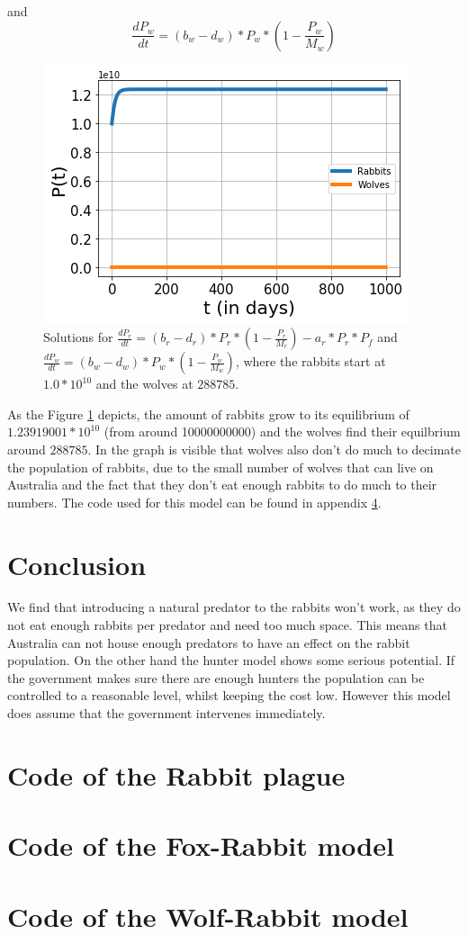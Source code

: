 \documentclass{article}
\begin{document}
and 
$$\frac{dP_w}{dt}=(b_w-d_w)*P_w*(1-\frac{P_w}{M_w})$$
\begin{figure}[h!]
    \centering
    \includegraphics[scale=0.78]{Pictures/RabbitWolves.png}
    \caption{Solutions for $\frac{dP_r}{dt}=(b_r-d_r)*P_r*(1-\frac{P_r}{M_r})-a_r*P_r*P_f$ and $\frac{dP_w}{dt}=(b_w-d_w)*P_w*(1-\frac{P_w}{M_w})$, where the rabbits start at $1.0*10^{10}$ and the wolves at $288785$.}
    \label{fig:RabbitsWolves}
\end{figure}
As the Figure \ref{fig:RabbitsWolves} depicts, the amount of rabbits grow to its equilibrium of $1.23919001*10^{10}$ (from around 10000000000) and the wolves find their equilbrium around $288785$. In the graph is visible that wolves also don't do much to decimate the population of rabbits, due to the small number of wolves that can live on Australia and the fact that they don't eat enough rabbits to do much to their numbers. The code used for this model can be found in appendix \ref{WolfRabbitModel}.
\section{Conclusion}
We find that introducing a natural predator to the rabbits won't work, as they do not eat enough rabbits per predator and need too much space. This means that Australia can not house enough predators to have an effect on the rabbit population. On the other hand the hunter model shows some serious potential. If the government makes sure there are enough hunters the population can be controlled to a reasonable level, whilst keeping the cost low. However this model does assume that the government intervenes immediately.


\appendix
\section{Code of the Rabbit plague}\label{Hunter_model}

\section{Code of the Fox-Rabbit model}\label{FoxRabbitModel}

\section{Code of the Wolf-Rabbit model}\label{WolfRabbitModel}

\end{document}
